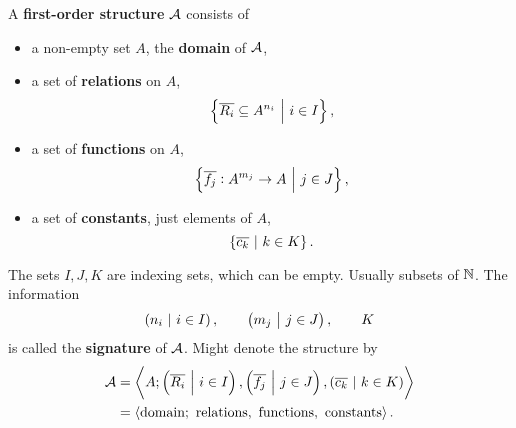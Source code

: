 \begin{definition}
A \textbf{first-order structure} $ \mathcal{A} $ consists of
\begin{itemize}
\item a non-empty set $ A $, the \textbf{domain} of $ \mathcal{A} $,
\item a set of \textbf{relations} on $ A $,
$$ \cbr{\overline{R_i} \subseteq A^{n_i} \st i \in I}, $$
\item a set of \textbf{functions} on $ A $,
$$ \cbr{\overline{f_j} : A^{m_j} \to A \st j \in J}, $$
\item a set of \textbf{constants}, just elements of $ A $,
$$ \cbr{\overline{c_k} \st k \in K}. $$
\end{itemize}
The sets $ I, J, K $ are indexing sets, which can be empty. Usually subsets of $ \mathbb{N} $. The information
$$ \br{n_i \st i \in I}, \qquad \br{m_j \st j \in J}, \qquad K $$
is called the \textbf{signature} of $ \mathcal{A} $. Might denote the structure by
\begin{align*}
\AAA
& = \abr{A; \br{\overline{R_i} \st i \in I}, \br{\overline{f_j} \st j \in J}, \br{\overline{c_k} \st k \in K}} \\
& = \abr{\text{domain}; \ \text{relations}, \ \text{functions}, \ \text{constants}}.
\end{align*}
\end{definition}

\pagebreak

